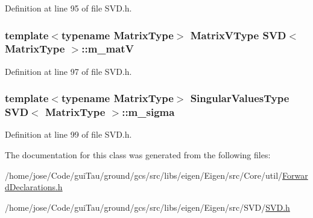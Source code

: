 Definition at line 95 of file S\-V\-D.\-h.

\hypertarget{class_s_v_d_aa3529e82390bb6ccc0b0036426df5c99}{
\subsubsection[{m\-\_\-mat\-V}]{\setlength{\rightskip}{0pt plus 5cm}template$<$typename Matrix\-Type$>$ {\bf Matrix\-V\-Type} {\bf S\-V\-D}$<$ Matrix\-Type $>$\-::m\-\_\-mat\-V\hspace{0.3cm}{\ttfamily [protected]}}}\label{class_s_v_d_aa3529e82390bb6ccc0b0036426df5c99}


Definition at line 97 of file S\-V\-D.\-h.

\hypertarget{class_s_v_d_a308e3c09ad05420e5b2d97a654060106}{
\subsubsection[{m\-\_\-sigma}]{\setlength{\rightskip}{0pt plus 5cm}template$<$typename Matrix\-Type$>$ {\bf Singular\-Values\-Type} {\bf S\-V\-D}$<$ Matrix\-Type $>$\-::m\-\_\-sigma\hspace{0.3cm}{\ttfamily [protected]}}}\label{class_s_v_d_a308e3c09ad05420e5b2d97a654060106}


Definition at line 99 of file S\-V\-D.\-h.



The documentation for this class was generated from the following files\-:\begin{DoxyCompactItemize}
\item 
/home/jose/\-Code/gui\-Tau/ground/gcs/src/libs/eigen/\-Eigen/src/\-Core/util/\hyperlink{_forward_declarations_8h}{Forward\-Declarations.\-h}\item 
/home/jose/\-Code/gui\-Tau/ground/gcs/src/libs/eigen/\-Eigen/src/\-S\-V\-D/\hyperlink{_s_v_d_8h}{S\-V\-D.\-h}\end{DoxyCompactItemize}
